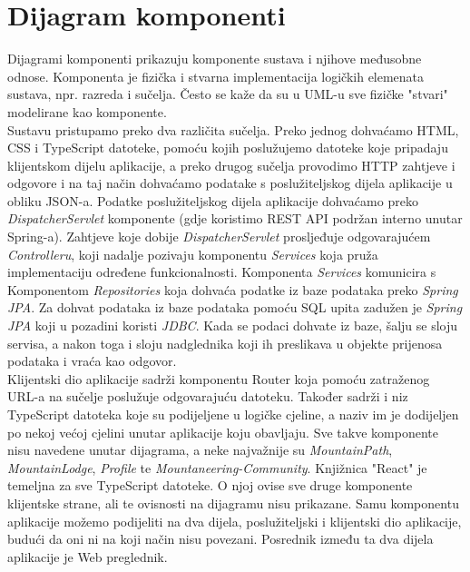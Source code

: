 			\section{Dijagram komponenti}
		Dijagrami komponenti prikazuju komponente sustava i njihove međusobne odnose. Komponenta je fizička i stvarna implementacija logičkih elemenata sustava, npr. razreda i sučelja. Često se kaže da su u UML-u sve fizičke "stvari" modelirane kao komponente.\\
		Sustavu pristupamo preko dva različita sučelja. Preko jednog dohvaćamo HTML, CSS i TypeScript datoteke, pomoću kojih poslužujemo datoteke koje pripadaju klijentskom dijelu aplikacije, a preko drugog sučelja provodimo HTTP zahtjeve i odgovore i na taj način dohvaćamo podatake s poslužiteljskog dijela aplikacije u obliku JSON-a. Podatke poslužiteljskog dijela aplikacije dohvaćamo preko \textit{DispatcherServlet} komponente (gdje koristimo REST API podržan interno unutar Spring-a).
		Zahtjeve koje dobije \textit{DispatcherServlet} prosljeđuje odgovarajućem \textit{Controlleru}, koji nadalje pozivaju komponentu \textit{Services} koja pruža implementaciju određene funkcionalnosti.
		Komponenta \textit{Services} komunicira s Komponentom \textit{Repositories} koja dohvaća podatke iz baze podataka preko \textit{Spring JPA}.
		Za dohvat podataka iz baze podataka pomoću SQL upita zadužen je \textit{Spring JPA} koji u pozadini koristi \textit{JDBC}. Kada se podaci dohvate iz baze,
		 šalju se sloju servisa, a nakon toga i sloju nadglednika koji ih preslikava u objekte prijenosa podataka i vraća kao odgovor. \\	
		 Klijentski dio aplikacije sadrži komponentu Router koja pomoću zatraženog URL-a na sučelje poslužuje odgovarajuću datoteku. Također sadrži i niz TypeScript datoteka koje su podijeljene u logičke cjeline, a naziv im je dodijeljen po nekoj većoj cjelini unutar aplikacije koju obavljaju. Sve takve komponente nisu navedene unutar dijagrama, a neke najvažnije su \textit{MountainPath}, \textit{MountainLodge}, \textit{Profile} te \textit{Mountaneering-Community}. Knjižnica "React" je temeljna za sve TypeScript datoteke. O njoj ovise sve druge komponente klijentske strane, ali te ovisnosti na dijagramu nisu prikazane. 
		 Samu komponentu aplikacije možemo podijeliti na dva dijela, poslužiteljski i klijentski dio aplikacije, budući da oni ni na koji način nisu povezani. Posrednik između ta dva dijela aplikacije je Web preglednik.
		
